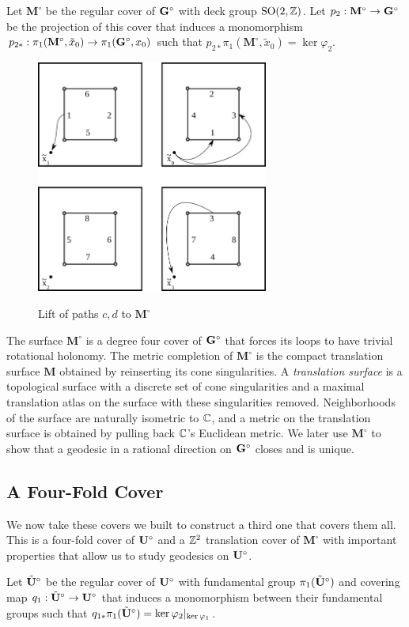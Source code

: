\documentclass[a4paper, 11pt]{article}
\def\bM{\mathbf{M}}
\def\bMs{\mathbf{M}^\circ}
\def\btUs{\btU^\circ}
\def\xtild{\tilde{x}_0}
\def\SO{\mathrm{SO}}
\begin{document}
\begin{Def}
Let $\bMs$ be the regular cover of $\mathbf{G}^\circ$ with deck group $\SO(2,\ZZ)$. Let $p_2:\bMs\rightarrow\bGs$ be the projection of this cover that induces a monomorphism $p_{2*}:\pi_1(\bMs,\xtild)\rightarrow\pi_1(\bGs,x_0)$ such that $p_{2*}\pi_1(\bMs,\xtild)=\ker\varphi_2$.
\end{Def}

\begin{figure}[H]
\centering
\includegraphics[width=3in]{monogroup.png}
\label{fig:arbitrarylift}
\caption{Lift of paths $c,d$ to $\bMs$}
\end{figure}
The surface $\bMs$ is a degree four cover of $\mathbf{G}^\circ$ that forces its loops to have trivial rotational holonomy. The metric completion of $\bMs$ is the compact translation surface $\bM$ obtained by reinserting its cone singularities. A \emph{translation surface} is a topological surface with a discrete set of cone singularities and a maximal translation atlas on the surface with these singularities removed. Neighborhoods of the surface are naturally isometric to $\mathbb{C}$, and a metric on the translation surface is obtained by pulling back $\mathbb{C}$'s Euclidean metric. We later use $\bMs$ to show that a geodesic in a rational direction on $\mathbf{G}^\circ$ closes and is unique.


\subsection{A Four-Fold Cover}
We now take these covers we built to construct a third one that covers them all. This is a four-fold cover of $\mathbf{U}^\circ$ and a $\mathbb{Z}^2$ translation cover of $\bMs$ with important properties that allow us to study geodesics on $\mathbf{U}^\circ$.
\begin{Def}
Let $\btUs$ be the regular cover of $\mathbf{U}^\circ$ with fundamental group $\pi_1(\btUs)$ and covering map $q_1:\btUs\rightarrow\bUs$ that induces a monomorphism between their fundamental groups such that $q_{1*}\pi_1(\btUs)=\ker\varphi_2\vert_{\ker\varphi_1}$.
\end{Def}
\end{document}
